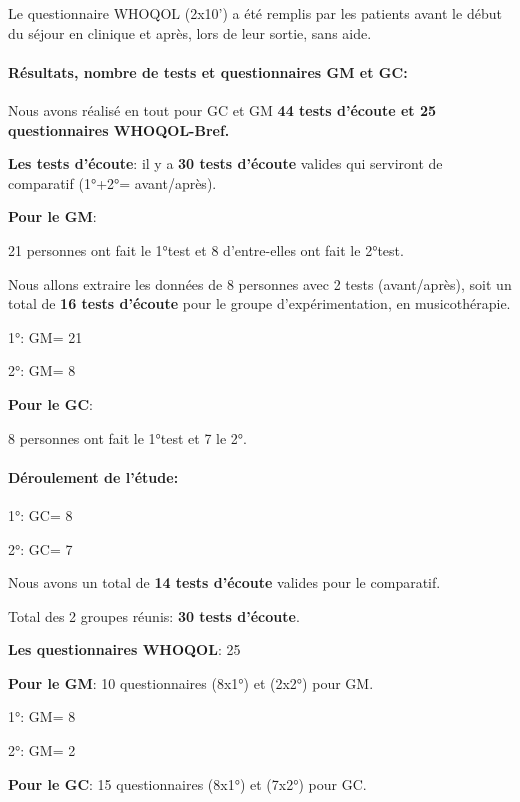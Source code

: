         
        Le questionnaire WHOQOL (2x10')  a été remplis par les
        patients avant le début du séjour en clinique et après, lors
        de leur sortie, sans aide.
        
       
      
      \paragraph{Résultats, nombre de tests et questionnaires GM et GC:}

       
     Nous avons réalisé en tout pour GC et GM \textbf{44 tests d'écoute et 25 questionnaires 
     WHOQOL-Bref.}
     
     \textbf{Les tests d'écoute}: il y a\textbf{ 30 tests d'écoute } valides qui serviront de
     comparatif (1°+2°= avant/après).
     
\textbf{Pour le GM}:
     
     21 personnes ont fait le 1°test et 8 d'entre-elles ont fait le
     2°test.

     Nous allons extraire les données de 8 personnes avec 2 tests (avant/après), soit  un
     total de \textbf{16 tests d'écoute } pour le groupe
     d'expérimentation, en musicothérapie.

     
     1°: GM= 21
    
     2°: GM= 8
     
     \textbf{ Pour le GC}:

     
     8 personnes ont fait le 1°test et 7 le 2°.
     
\paragraph{Déroulement de l'étude:}


     1°: GC= 8

     2°: GC= 7
     
     Nous avons un total de \textbf{14 tests d'écoute} valides pour le
     comparatif.

     
Total des 2 groupes réunis:\textbf{ 30 tests d'écoute}.
     


\textbf{Les questionnaires WHOQOL}: 25

     \textbf{Pour le GM}:      
     10 questionnaires (8x1°) et (2x2°) pour GM.
     
     1°: GM= 8 

     
     2°: GM= 2
   
     
\textbf{ Pour le GC}:
15 questionnaires (8x1°) et (7x2°) pour GC.
    
